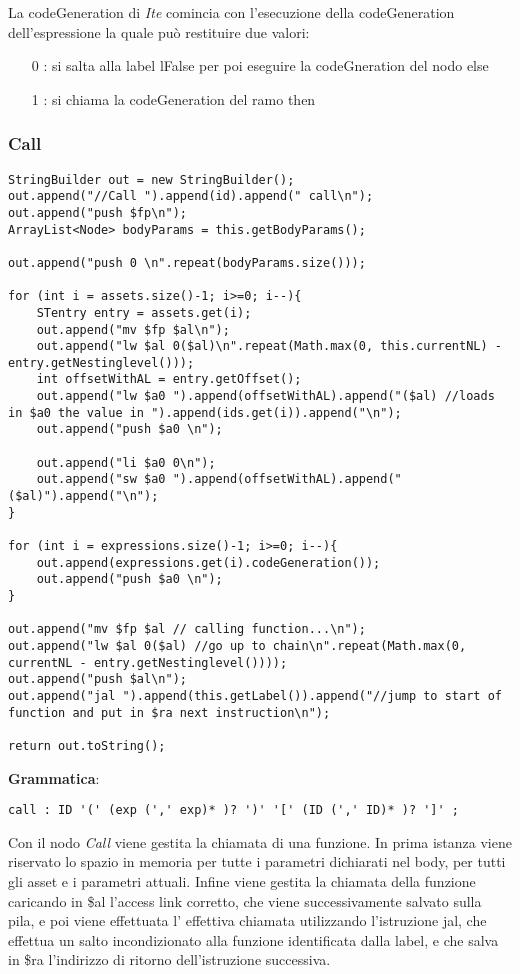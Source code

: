 \documentclass[12pt,twoside,openright,a4paper]{report}
\begin{document}
La codeGeneration di \textit{Ite} comincia con l'esecuzione della codeGeneration dell'espressione la quale può restituire due valori: 
\begin{itemize}
    \item[0]: si salta alla label lFalse per poi eseguire la codeGneration del nodo else
    \item[1]: si chiama la codeGeneration del ramo then
\end{itemize}


\subsubsection{Call}
\begin{lstlisting}
StringBuilder out = new StringBuilder();
out.append("//Call ").append(id).append(" call\n");
out.append("push $fp\n");
ArrayList<Node> bodyParams = this.getBodyParams();

out.append("push 0 \n".repeat(bodyParams.size()));

for (int i = assets.size()-1; i>=0; i--){
    STentry entry = assets.get(i);
    out.append("mv $fp $al\n");
    out.append("lw $al 0($al)\n".repeat(Math.max(0, this.currentNL) - entry.getNestinglevel()));
    int offsetWithAL = entry.getOffset();
    out.append("lw $a0 ").append(offsetWithAL).append("($al) //loads in $a0 the value in ").append(ids.get(i)).append("\n");
    out.append("push $a0 \n");
    
    out.append("li $a0 0\n");
    out.append("sw $a0 ").append(offsetWithAL).append("($al)").append("\n");
}

for (int i = expressions.size()-1; i>=0; i--){
    out.append(expressions.get(i).codeGeneration());
    out.append("push $a0 \n");
}

out.append("mv $fp $al // calling function...\n");
out.append("lw $al 0($al) //go up to chain\n".repeat(Math.max(0, currentNL - entry.getNestinglevel())));
out.append("push $al\n");
out.append("jal ").append(this.getLabel()).append("//jump to start of function and put in $ra next instruction\n");

return out.toString();
\end{lstlisting}
\textbf{Grammatica}:
\begin{lstlisting}
call : ID '(' (exp (',' exp)* )? ')' '[' (ID (',' ID)* )? ']' ;
\end{lstlisting}
Con il nodo \textit{Call} viene gestita la chiamata di una funzione. In prima istanza viene riservato lo spazio in memoria per tutte i parametri dichiarati nel body, per tutti gli asset e i parametri attuali. Infine viene gestita la chiamata della funzione caricando in \$al l'access link corretto, che viene successivamente salvato sulla pila, e poi viene effettuata l' effettiva chiamata utilizzando l'istruzione jal, che effettua un salto incondizionato alla funzione identificata dalla label, e che salva in \$ra l'indirizzo di ritorno dell'istruzione successiva.
\end{document}
